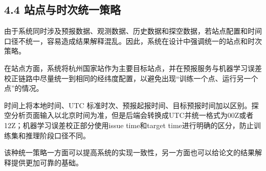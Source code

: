 \subsection{4.4 站点与时次统一策略}

由于系统同时涉及预报数据、观测数据、历史数据和探空数据，若站点配置和时间口径不统一，容易造成结果解释混乱。因此，系统在设计中强调统一的站点和时次策略。

在站点方面，系统将杭州国家站作为主要目标站点，并在预报服务与机器学习误差校正链路中尽量统一到相同的经纬度配置，以避免出现“训练一个点、运行另一个点”的情况。

时间上将本地时间、UTC 标准时次、预报起报时间、目标预报时间加以区别。探空分析页面输入以北京时间为准，但是后端会转换成UTC并统一格式为00Z或者12Z；机器学习误差校正部分使用issue time和target time进行明确的区分，防止训练集和推理阶段口径不同。

该种统一策略一方面可以提高系统的实现一致性，另一方面也可以给论文的结果解释提供更加可靠的基础。

